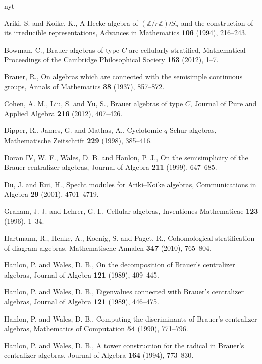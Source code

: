 \documentclass[10pt,a4paper]{amsart}
\newcommand{\1}{\mathfrak{1}}
\begin{document}
\begin{thebibliography}{nyt}

Ariki, S. and Koike, K., A Hecke algebra of $(\mathbb{Z}/r\mathbb{Z}) \wr S_n$ and the construction of its irreducible representations, {Advances in Mathematics} {\bf 106} (1994), 216--243.

Bowman, C., Brauer algebras of type $C$ are cellularly stratified, {Mathematical Proceedings of the Cambridge Philosophical Society} {\bf 153} (2012), 1--7.

Brauer, R., On algebras which are connected with the semisimple continuous groups, {Annals of Mathematics} {\bf 38} (1937), 857--872.

Cohen, A. M., Liu, S. and Yu, S., Brauer algebras of type $C$, {Journal of Pure and Applied Algebra} {\bf 216} (2012), 407--426.

Dipper, R., James, G. and Mathas, A., Cyclotomic $q$-Schur algebras, {Mathematische Zeitschrift} {\bf 229} (1998), 385--416.

Doran IV, W. F., Wales, D. B. and Hanlon, P. J., On the semisimplicity of the Brauer centralizer algebras, {Journal of Algebra} {\bf 211} (1999), 647--685.

Du, J. and Rui, H., Specht modules for Ariki--Koike algebras, {Communications in Algebra} {\bf 29} (2001), 4701--4719.

Graham, J. J. and Lehrer, G. I., Cellular algebras, {Inventiones Mathematicae} {\bf 123} (1996), 1--34.

Hartmann, R., Henke, A., Koenig, S. and Paget, R., Cohomological stratification of diagram algebras, {Mathematische Annalen} {\bf 347} (2010), 765--804.

Hanlon, P. and Wales, D. B., On the decomposition of Brauer's centralizer algebras, {Journal of Algebra} {\bf 121} (1989), 409--445.

Hanlon, P. and Wales, D. B., Eigenvalues connected with Brauer's centralizer algebras, {Journal of Algebra} {\bf 121} (1989), 446--475.

Hanlon, P. and Wales, D. B., Computing the discriminants of Brauer's centralizer algebras, {Mathematics of Computation} {\bf 54} (1990), 771--796.

Hanlon, P. and Wales, D. B., A tower construction for the radical in Brauer's centralizer algebras, {Journal of Algebra} {\bf 164} (1994), 773--830.


\end{thebibliography}
\end{document}
